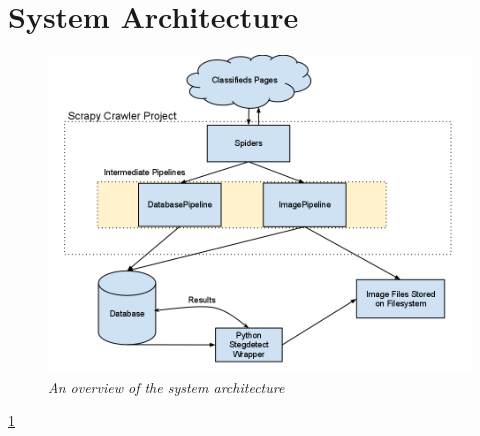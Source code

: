 \section{System Architecture}
\label{sec:sysarch}
\begin{figure}[h!]
\includegraphics[scale=0.5]{ArchDiagThesis}
\caption{\emph{An overview of the system architecture}}
\label{fig:architecture}
\end{figure} 
\ref{fig:architecture}

